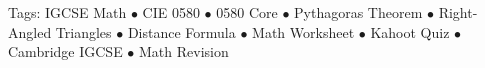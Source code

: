 \documentclass[11pt,a4paper]{article}
\begin{document}
\vspace{14pt}
\begin{center}
  \sffamily\scriptsize\textcolor{textmuted}{
    Tags: IGCSE Math $\bullet$ CIE 0580 $\bullet$ 0580 Core $\bullet$ Pythagoras Theorem $\bullet$ Right-Angled Triangles $\bullet$ Distance Formula $\bullet$ Math Worksheet $\bullet$ Kahoot Quiz $\bullet$ Cambridge IGCSE $\bullet$ Math Revision
  }
\end{center}
\end{document}
